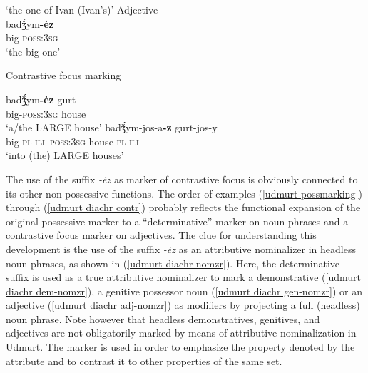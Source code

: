 \begin{exe}
\begin{xlist}
\begin{xlist}
\glt	 ‘the one of Ivan (Ivan's)’
\ex 	\rm{Adjective}\\ \label{udmurt diachr adj-nomzr}
\gll	badǯ́ym\textbf{-ėz}\\
	big-\textsc{poss:3sg}\\
\glt	 ‘the big one’
\end{xlist}
\ex \rm{Contrastive focus marking} \label{udmurt diachr contr}
\begin{xlist}
\ex	
\gll	badǯ́ym\textbf{-ėz} gurt\\
	big-\textsc{poss:3sg} house\\
\glt	‘a/the LARGE house’
\ex	
\gll	badǯ́ym-jos-a\textbf{-z} gurt-jos-y\\
	big-\textsc{pl}-\textsc{ill}-\textsc{poss:3sg} house-\textsc{pl}-\textsc{ill}\\
\glt	‘into (the) LARGE houses’
\end{xlist}
\end{xlist}
\end{exe}
The use of the suffix \textit{-ėz} as marker of contrastive focus is obviously connected to its other non-possessive functions. The order of examples (\ref{udmurt possmarking}) through (\ref{udmurt diachr contr}) probably reflects the functional expansion of the original possessive marker to a “determinative” marker on noun phrases and a contrastive focus marker on adjectives. The clue for understanding this development is the use of the suffix \textit{-ėz} as an attributive nominalizer in headless noun phrases, as shown in (\ref{udmurt diachr nomzr}). Here, the determinative suffix is used as a true attributive nominalizer to mark a demonstrative (\ref{udmurt diachr dem-nomzr}), a genitive possessor noun (\ref{udmurt diachr gen-nomzr}) or an adjective (\ref{udmurt diachr adj-nomzr}) as modifiers by projecting a full (headless) noun phrase. Note however that headless demonstratives, genitives, and adjectives are not obligatorily marked by means of attributive nominalization in Udmurt. The marker is used in order to emphasize the property denoted by the attribute and to contrast it to other properties of the same set.

